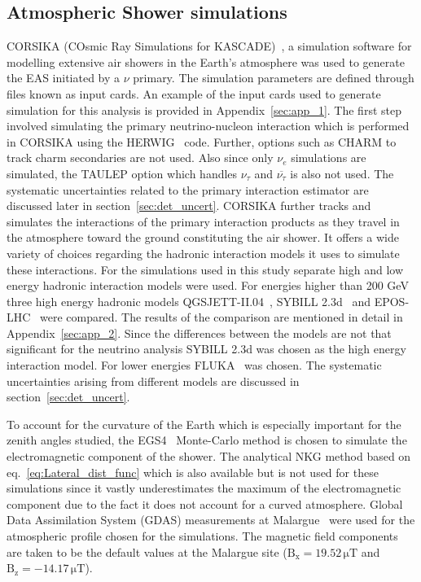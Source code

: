 \subsection{Atmospheric Shower simulations}
\label{subsec:sim_EAS}
CORSIKA (COsmic Ray Simulations for KASCADE)~\cite{Heck:1998vt}, a simulation software for modelling extensive air showers in the Earth's atmosphere was used to generate the EAS initiated by a $\nu$ primary. The simulation parameters are defined through files known as input cards. An example of the input cards used to generate simulation for this analysis is provided in Appendix~\ref{sec:app_1}. The first step involved simulating the primary neutrino-nucleon interaction which is performed in CORSIKA using the HERWIG~\cite{Corcella:2000bw} code. Further, options such as CHARM to track charm secondaries are not used. Also since only $\nu_e$ simulations are simulated, the TAULEP option which handles $\nu_{\tau}$ and $\overline{\nu_{\tau}}$ is also not used. The systematic uncertainties related to the primary interaction estimator are discussed later in section~\ref{sec:det_uncert}. CORSIKA further tracks and simulates the interactions of the primary interaction products as they travel in the atmosphere toward the ground constituting the air shower. It offers a wide variety of choices regarding the hadronic interaction models it uses to simulate these interactions. For the simulations used in this study separate high and low energy hadronic interaction models were used. For energies higher than 200 GeV three high energy hadronic models QGSJETT-II.04~\cite{Ostapchenko:2010vb}, SYBILL 2.3d~\cite{Riehn:2019jet} and EPOS-LHC~\cite{Pierog:2013ria} were compared. The results of the comparison are mentioned in detail in Appendix~\ref{sec:app_2}. Since the differences between the models are not that significant for the neutrino analysis SYBILL 2.3d was chosen as the high energy interaction model. For lower energies FLUKA~\cite{Ferrari:2005zk,Battistoni:2015epi} was chosen. The systematic uncertainties arising from different models are discussed in section~\ref{sec:det_uncert}.  

To account for the curvature of the Earth which is especially important for the zenith angles studied, the EGS4~\cite{Nelson:1990sr} Monte-Carlo method is chosen to simulate the electromagnetic component of the shower. The analytical NKG method based on eq.~\ref{eq:Lateral_dist_func} which is also available but is not used for these simulations since it vastly underestimates the maximum of the electromagnetic component due to the fact it does not account for a curved atmosphere. Global Data Assimilation System (GDAS) measurements at Malargue~\cite{PierreAuger:2012jsu} were used for the atmospheric profile chosen for the simulations. The magnetic field components are taken to be the default values at the Malargue site ($\mathrm{B_x = 19.52\,\mu T}$ and $\mathrm{B_z = -14.17 \,\mu T}$). 

